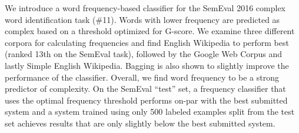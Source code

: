 We introduce a word frequency-based classifier for the SemEval 2016 complex word identification task (\#11).  Words with lower frequency are predicted as complex based on a threshold optimized for G-score.  We examine three different corpora for calculating frequencies and find English Wikipedia to perform best (ranked 13th on the SemEval task), followed by the Google Web Corpus and lastly Simple English Wikipedia. Bagging is also shown to slightly improve the performance of the classifier.                          Overall, we find word frequency to be a strong predictor of complexity.  On the SemEval ``test'' set, a frequency classifier that uses the optimal frequency threshold performs on-par with the best submitted system and a system trained using only 500 labeled examples split from the test set achieves results that are only slightly below the best submitted system.
